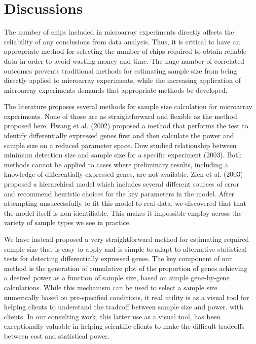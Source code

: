 \documentclass{bioinfo}
\begin{document}
\section{Discussions}

The number of chips included in microarray experiments directly
affects the reliability of any conclusions from data analysis.
Thus, it is critical to have an appropriate method for selecting
the number of chips required to obtain reliable data in order to
avoid wasting money and time. The huge number of correlated
outcomes prevents traditional methods for estimating sample size
from being directly applied to microarray experiments, while the
increasing application of microarray experiments demands that
appropriate methods be developed.

The literature proposes several methods for sample size
calculation for microarray experiments. None of those are as
straightforward and flexible as the method proposed here. Hwang et
al. (2002) proposed a method that performs the test to identify
differentially expressed genes first and then calculate the power
and sample size on a reduced parameter space. Dow studied
relationship between minimum detection size and sample size for a
specific experiment (2003). Both methods cannot be applied to
cases where preliminary results, including a knowledge of
differentially expressed genes, are not available. Zien et al.
(2003) proposed a hierarchical model which includes several
different sources of error and recommend heuristic choices for the
key parameters in the model.  After attempting unsuccessfully to
fit this model to real data, we discovered that that the model
itself is non-identifiable.  This makes it impossible employ
across the variety of sample types we see in practice.

We have instead proposed a very straightforward method for
estimating required sample size that is easy to apply and is
simple to adapt to alternative statistical tests for detecting
differentially expressed genes. The key component of our method is
the generation of cumulative plot of the proportion of genes
achieving a desired power as a function of sample size, based on
simple gene-by-gene calculations.  While this mechanism can be
used to select a sample size numerically based on pre-specified
conditions, it real utility is as a visual tool for helping
clients to understand the tradeoff between sample size and power.
with clients.  In our consulting work, this latter use as a visual
tool, has been exceptionally valuable in helping scientific
clients to make the difficult tradeoffs between cost and
statistical power.
\end{document}
